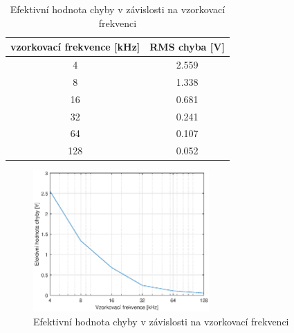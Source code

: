 \documentclass[twoside]{article}
\begin{document}
\begin{table}
    \centering
    \begin{tabular}{c|c}
        vzorkovací frekvence [kHz] & RMS chyba [V]\\ \hline
        4 & 2.559 \\
        8 & 1.338 \\
        16 & 0.681 \\
        32 & 0.241 \\
        64 & 0.107 \\
        128 & 0.052        
    \end{tabular}
    \caption{Efektivní hodnota chyby v závislosti na vzorkovací frekvenci}
    \label{chyby}
\end{table}

\begin{figure}
    \centering
    \includegraphics[width=0.6\textwidth]{rms_chyba.eps}
    \caption{Efektivní hodnota chyby v závislosti na vzorkovací frekvenci}
    \label{rms_chyba}
\end{figure}
\end{document}

